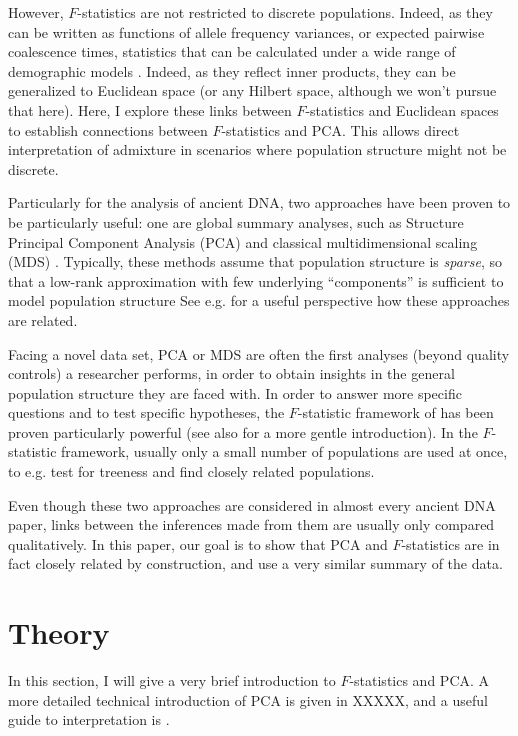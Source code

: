 \documentclass[12pt,a4pape, fullpage]{article}
\begin{document}
However, $F$-statistics are not restricted to discrete populations. Indeed, as they can be written as functions of allele frequency variances, or expected pairwise coalescence times, statistics that can be calculated under a wide range of demographic models \cite{peter2016}. Indeed, as they reflect inner products, they can be generalized to Euclidean space \cite{oteo2021} (or any Hilbert space, although we won't pursue that here).
Here, I explore these links between $F$-statistics and Euclidean spaces to establish connections between $F$-statistics and PCA. This allows direct interpretation of admixture in scenarios where population structure might not be discrete.




Particularly for the analysis of ancient DNA, two approaches have been proven to be particularly useful: one are global summary analyses, such as Structure \citep{pritchard2000, alexander2009} Principal Component Analysis (PCA) \citep{cavalli-sforza1994, reich2008, novembre2008, mcvean2009} and classical multidimensional scaling (MDS) \cite{fu2016, malaspinas_bammds}. Typically, these methods assume that population structure is \emph{sparse}, so that a low-rank approximation with few underlying ``components'' is sufficient to model population structure See e.g. \cite{engelhardt2010} for a useful perspective how these approaches are related.

Facing a novel data set, PCA or MDS are often the first analyses (beyond quality controls) a researcher performs, in order to obtain insights in the general population structure they are faced with. In order to answer more specific questions and to test specific hypotheses, the $F$-statistic framework of \cite{patterson2012} has been proven particularly powerful (see also \cite{peter2016} for a more gentle introduction). In the $F$-statistic framework, usually only a small number of populations are used at once, to e.g. test for treeness and find closely related populations.

Even though these two approaches are considered in almost every ancient DNA paper, links between the inferences made from them are usually only compared qualitatively. In this paper, our goal is to show that PCA and $F$-statistics are in fact closely related by construction, and use a very similar summary of the data. 





	
\section{Theory}
In this section, I will give a very brief introduction to $F$-statistics and PCA. A more detailed technical introduction of PCA is given in XXXXX, and a useful guide to interpretation is \cite{cavalli-sforza1994}.
\end{document}
